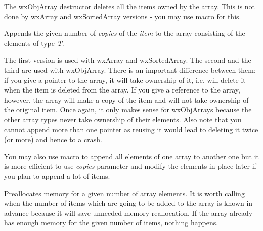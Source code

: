 \label{wxarraydtor}




The wxObjArray destructor deletes all the items owned by the array. This is not
done by wxArray and wxSortedArray versions - you may use 
 macro for this.

\label{wxarrayadd}




Appends the given number of {\it copies} of the {\it item} to the array
consisting of the elements of type {\it T}.

The first version is used with wxArray and wxSortedArray. The second and the
third are used with wxObjArray. There is an important difference between
them: if you give a pointer to the array, it will take ownership of it, i.e.
will delete it when the item is deleted from the array. If you give a reference
to the array, however, the array will make a copy of the item and will not take
ownership of the original item. Once again, it only makes sense for wxObjArrays
because the other array types never take ownership of their elements. Also note
that you cannot append more than one pointer as reusing it would lead to
deleting it twice (or more) and hence to a crash.

You may also use  macro to append all
elements of one array to another one but it is more efficient to use 
{\it copies} parameter and modify the elements in place later if you plan to
append a lot of items.

\label{wxarrayalloc}


Preallocates memory for a given number of array elements. It is worth calling
when the number of items which are going to be added to the array is known in
advance because it will save unneeded memory reallocation. If the array already
has enough memory for the given number of items, nothing happens.

